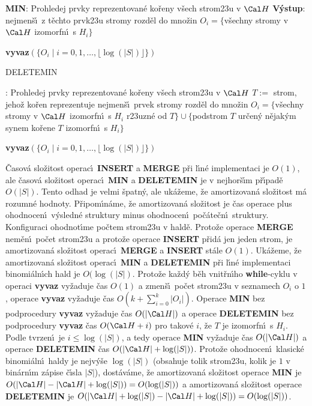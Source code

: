 \documentclass[a4paper,12pt]{article}
\begin{document}
{\bf MIN}:\newline 
Prohledej prvky reprezentovan\'e ko\v reny v\v sech 
strom\accent23u  
v $\Cal H$\newline 
{\bf V\'ystup}: nejmen\v s\'\i\ z t\v echto prvk\accent23u\newline 
stromy rozd\v el do mno\v zin $O_i=\{$v\v sechny stromy v 
$\Cal H$ izomorfn\'\i\ s $H_i\}$\newline 
{\bf vyvaz$(\{O_i\mid i=0,1,\dots,\lfloor\log(|S|)\rfloor \})$
\bigskip

DELETEMIN}:\newline 
Prohledej prvky reprezentovan\'e ko\v reny v\v sech 
strom\accent23u v $\Cal H$\newline 
$T:=$ strom, jeho\v z ko\v ren repre\-zentuje nejmen\v s\'\i\ 
prvek\newline 
stromy rozd\v el do mno\v zin $O_i=\{$v\v sechny stromy v 
$\Cal H$ izomorfn\'\i\ s $H_i$ r\accent23uzn\'e od $T\}\cup \{$podstrom $
T$ ur\v cen\'y n\v ejak\'ym synem ko\v rene $T$ 
izomorfn\'\i\ s $H_i\}$\newline 
{\bf vyvaz$(\{O_i\mid i=0,1,\dots,\lfloor\log(|S|)\rfloor \})$
\bigskip

\flushpar}\v Casov\'a slo\v zitost operac\'\i\ {\bf INSERT} a {\bf MER\-GE} p\v ri l\'\i n\'e 
implementaci je $O(1)$, ale \v casov\'a slo\v zitost operac\'\i\ {\bf MIN} a 
{\bf DELETEMIN} je v nejhor\v s\'\i m p\v r\'\i pad\v e $O(|S|)$. Tento odhad je 
velmi \v spatn\'y, ale uk\'a\v zeme, \v ze amortizovan\'a slo\v zitost m\'a rozumn\'e 
hodnoty. 
P\v ripom\'\i n\'ame, \v ze amortizovan\'a slo\v zi\-tost je \v cas operace plus 
ohodnocen\'\i\ v\'ysledn\'e struktury minus ohodnocen\'\i\ 
po\v c\'ate\v cn\'\i\ struktury. 
Konfiguraci ohodnot\'\i me po\v ctem strom\accent23u v 
hald\v e. 
Proto\v ze ope\-race {\bf MERGE} nem\v en\'\i\ po\v cet strom\accent23u a 
proto\v ze operace {\bf INSERT} p\v rid\'a jen jeden strom, je 
amortizovan\'a slo\v zitost operac\'\i\ {\bf MERGE} a {\bf INSERT} st\'ale $
O(1)$.
Uk\'a\v zeme, \v ze amortizovan\'a slo\v zitost operac\'\i\ {\bf MIN} a {\bf DELETEMIN }
p\v ri l\'\i n\'e implementaci binomi\'aln\'\i ch hald je $O(\log
(|S|)$. 
Proto\v ze ka\v zd\'y b\v eh 
vnit\v rn\'\i ho {\bf while}-cyklu v operaci {\bf vyvaz} vy\v zaduje \v cas $
O(1)$ 
a zmen\v s\'\i\ po\v cet strom\accent23u v seznamech $O_i$ o $1$, 
ope\-ra\-ce {\bf vyvaz} vy\v zaduje \v cas $O(k+\sum_{i=0}^k|O_i|
)$. Ope\-ra\-ce {\bf MIN}
bez podprocedury {\bf vyvaz} vy\v zaduje \v cas $O(|\Cal H|)$ a operace 
{\bf DELETEMIN} bez podprocedury {\bf vyvaz }\v cas $O(\Cal H+i)$ pro 
takov\'e $i$, \v ze $T$ je izomorfn\'\i\ s $H_i$. Podle tvrzen\'\i\ je $
i\le\log(|S|)$, a 
tedy ope\-ra\-ce {\bf MIN} vy\v zaduje \v cas $O(|\Cal H|)$ a ope\-race 
{\bf DELETEMIN }\v cas $O(|\Cal H|+\log(|S|))$. Proto\v ze  
ohodnocen\'\i\ klasick\'e binomi\'aln\'\i\ haldy je nejv\'y\v se $\log
(|S|)$ 
(obsahuje tolik strom\accent23u, kolik je $1$ v bin\'arn\'\i m z\'apise 
\v c\'\i sla $|S|$), dost\'av\'ame, \v ze amortizovan\'a slo\v zitost ope\-race {\bf MIN} je 
$O(|\Cal H|-|\Cal H|+\log(|S|))=O(\log(|S|))$ a amortizovan\'a slo\v zitost 
operace {\bf DELETEMIN} je $O(|\Cal H|+\log(|S|)-|\Cal H|+\log(|S
|))=O(\log(|S|))$.
\medskip
\end{document}
